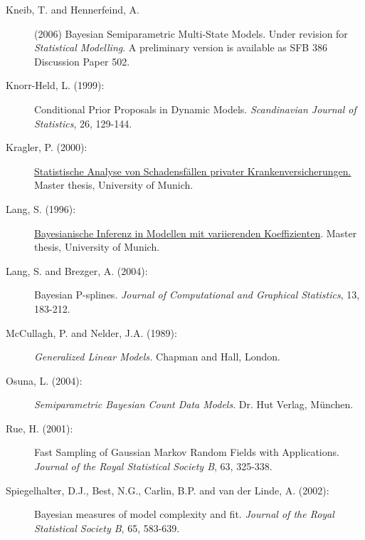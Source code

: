 \begin{description}
\item[Kneib, T. and Hennerfeind, A.] (2006) Bayesian Semiparametric
Multi-State Models. Under revision for {\em Statistical Modelling}.
A preliminary version is available as SFB 386 Discussion Paper 502.

\item[Knorr-Held, L. (1999):]
Conditional Prior Proposals in Dynamic Models. {\em Scandinavian
Journal of Statistics}, 26, 129-144.

\item[Kragler, P. (2000):] \href{http://www.scor.fr/us/2_laureat.asp?pays=2}
{Statistische Analyse von Schadensf\"allen privater
Krankenversicherungen.} Master thesis, University of Munich.

\item[Lang, S. (1996):]
\href{mailto:stefan.lang@uibk.ac.at} {Bayesianische Inferenz in
Modellen mit variierenden Koeffizienten}. Master thesis, University
of Munich.

\item[Lang, S. and Brezger, A. (2004):]
Bayesian P-splines. {\em Journal of Computational and Graphical Statistics}, 13, 183-212.

\item[McCullagh, P. and Nelder, J.A. (1989):] {\em Generalized Linear Models.} Chapman and Hall, London.

\item[Osuna, L. (2004):] {\it Semiparametric Bayesian Count Data
Models}. Dr. Hut Verlag, M\"{u}nchen.

\item[Rue, H. (2001):] Fast Sampling of Gaussian Markov Random Fields with Applications.
{\em Journal of the Royal Statistical Society B}, 63, 325-338.

\item[Spiegelhalter, D.J., Best, N.G., Carlin, B.P. and van der Linde, A. (2002):]
Bayesian measures of model complexity and fit. {\em Journal of the
Royal Statistical Society B}, 65, 583-639.

\end{description}
